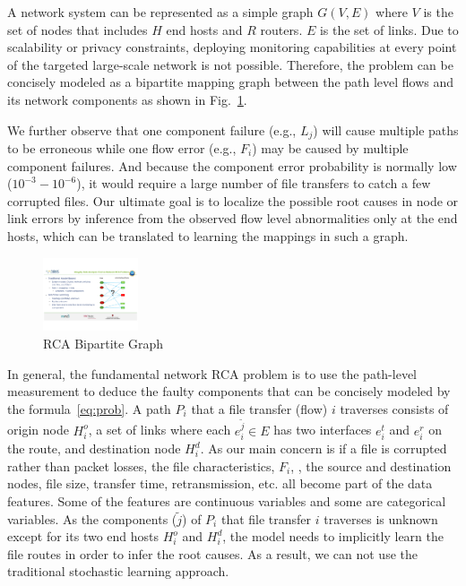 A network system can be represented as a simple graph $G(V,E)$ where $V$ is the set of nodes that includes $H$ end hosts and $R$ routers. $E$ is the set of links. 
Due to scalability or privacy constraints, deploying monitoring capabilities at every point of the targeted large-scale network is not possible. Therefore, the problem can be concisely modeled as a bipartite mapping graph between the path level flows and its network components as shown in Fig.~\ref{fig:bipartite}. 

We further observe that one component failure (e.g., $L_j$) will cause multiple paths to be erroneous while one flow error (e.g., $F_i$) may be caused by multiple component failures. And because the component error probability is normally low ($10^{-3} - 10^{-6}$), it would require a large number of file transfers to catch a few corrupted files. Our ultimate goal is to localize the possible root causes in node or link errors by inference from the observed flow level abnormalities only at the end hosts, which can be translated to learning the mappings in such a graph.

\begin{figure}
  \begin{center}
    \includegraphics[width=0.25\textwidth]{./figure/RCABipartite.pdf}
  \end{center}
  \vspace{-5pt}
\caption{RCA Bipartite Graph}
\vspace{-5pt}
\label{fig:bipartite}
\end{figure}

In general, the fundamental network RCA problem is to use the path-level measurement to deduce the faulty components that can be concisely modeled by the formula~\ref{eq:prob}.
A path $P_i$ that a file transfer (flow) $i$ traverses consists of origin node $H_i^o$, a set of links where each $e_i^{\tilde{j}}\in E$ has two interfaces $e_i^t$ and $e_i^r$ on the route, and destination node $H_i^d$. 
As our main concern is if a file is corrupted rather than packet losses, the file characteristics, $F_i$, \eg, the source and destination nodes, file size, transfer time, retransmission, etc. all become part of the data features. 
Some of the features are continuous variables and some are categorical variables.
As the components ($\tilde{j}$) of $P_i$ that file transfer $i$ traverses is unknown except for its two end hosts $H_i^o$ and $H_i^d$, the model needs to implicitly learn the file routes in order to infer the root causes.   
As a result, we can not use the traditional stochastic learning approach.

